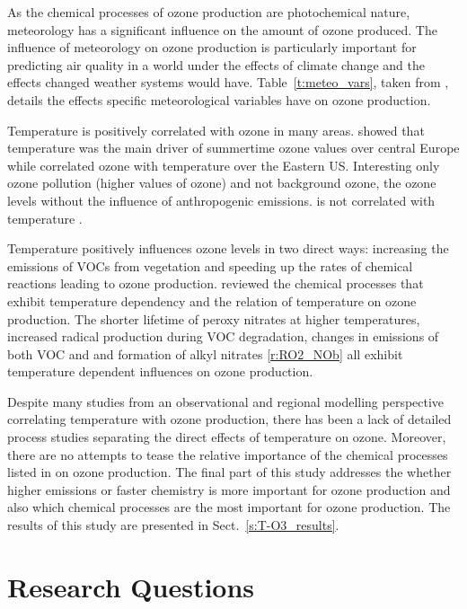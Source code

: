 As the chemical processes of ozone production are photochemical nature, meteorology has a significant influence on the amount of ozone produced.
The influence of meteorology on ozone production is particularly important for predicting air quality in a world under the effects of climate change and the effects changed weather systems would have.
Table~\ref{t:meteo_vars}, taken from \citet{Jacob:2009}, details the effects specific meteorological variables have on ozone production.

Temperature is positively correlated with ozone in many areas.
\citet{Otero:2016} showed that temperature was the main driver of summertime ozone values over central Europe while \citet{Camalier:2007} correlated ozone with temperature over the Eastern US.
Interesting only ozone pollution (higher values of ozone) and not background ozone, the ozone levels without the influence of anthropogenic emissions. is not correlated with temperature \citep{Sillman:1995a}.

Temperature positively influences ozone levels in two direct ways: increasing the emissions of VOCs from vegetation and speeding up the rates of chemical reactions leading to ozone production.
\citet{Pusede:2015} reviewed the chemical processes that exhibit temperature dependency and the relation of temperature on ozone production.
The shorter lifetime of peroxy nitrates at higher temperatures, increased radical production during VOC degradation, changes in emissions of both VOC and  and formation of alkyl nitrates \eqref{r:RO2_NOb} all exhibit temperature dependent influences on ozone production.

Despite many studies from an observational and regional modelling perspective correlating temperature with ozone production, there has been a lack of detailed process studies separating the direct effects of temperature on ozone.
Moreover, there are no attempts to tease the relative importance of the chemical processes listed in \citet{Pusede:2015} on ozone production.
The final part of this study addresses the whether higher emissions or faster chemistry is more important for ozone production and also which chemical processes are the most important for ozone production.
The results of this study are presented in Sect.~\ref{s:T-O3_results}.


\section{Research Questions} \label{s:research_questions}

